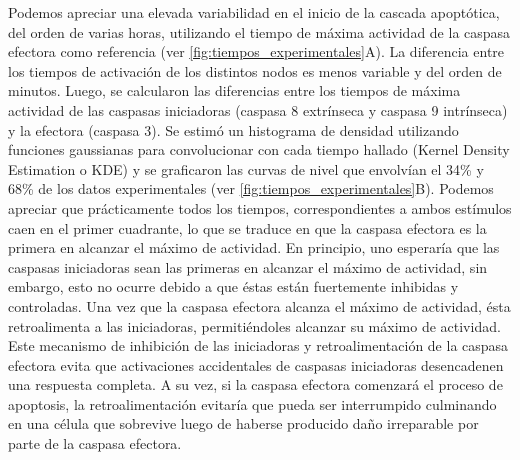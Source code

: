 Podemos apreciar una elevada variabilidad en el inicio de la cascada apoptótica, del orden de varias horas, utilizando el tiempo de máxima actividad de la caspasa efectora como referencia (ver \cref{fig:tiempos_experimentales}A). La diferencia entre los tiempos de activación de los distintos nodos es menos variable y del orden de minutos.  Luego, se calcularon las diferencias entre los tiempos de máxima actividad de las caspasas iniciadoras (caspasa 8 extrínseca y caspasa 9 intrínseca) y la efectora (caspasa 3). Se estimó un histograma de densidad utilizando funciones gaussianas para convolucionar con cada tiempo hallado (Kernel Density Estimation o KDE) y se graficaron las curvas de nivel que envolvían el 34\% y 68\% de los datos experimentales (ver \cref{fig:tiempos_experimentales}B). Podemos apreciar que prácticamente todos los tiempos, correspondientes a ambos estímulos caen en el primer cuadrante, lo que se traduce en que la caspasa efectora es la primera en alcanzar el máximo de actividad. En principio, uno esperaría que las caspasas iniciadoras sean las primeras en alcanzar el máximo de actividad, sin embargo, esto no ocurre debido a que éstas están fuertemente inhibidas y controladas. Una vez que la caspasa efectora alcanza el máximo de actividad, ésta retroalimenta a las iniciadoras, permitiéndoles alcanzar su máximo de actividad. Este mecanismo de inhibición de las iniciadoras y retroalimentación de la caspasa efectora evita que activaciones accidentales de caspasas iniciadoras desencadenen una respuesta completa. A su vez, si la caspasa efectora comenzará el proceso de apoptosis, la retroalimentación evitaría que pueda ser interrumpido culminando en una célula que sobrevive luego de haberse producido daño irreparable por parte de la caspasa efectora.

